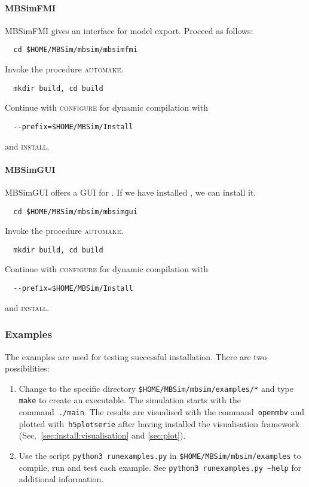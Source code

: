\paragraph{MBSimFMI}
MBSimFMI gives an interface for model export. Proceed as follows:
\begin{verbatim}
  cd $HOME/MBSim/mbsim/mbsimfmi
\end{verbatim}
Invoke the procedure \textsc{automake}.
\begin{verbatim}
  mkdir build, cd build
\end{verbatim}
Continue with \textsc{configure} for dynamic compilation with
\begin{verbatim}
  --prefix=$HOME/MBSim/Install
\end{verbatim}
and \textsc{install}.
%
\paragraph{MBSimGUI}
MBSimGUI offers a GUI for \MBSim{}. If we have installed \OpenMBV{}, we can install it.
\begin{verbatim}
  cd $HOME/MBSim/mbsim/mbsimgui
\end{verbatim}
Invoke the procedure \textsc{automake}.
\begin{verbatim}
  mkdir build, cd build
\end{verbatim}
Continue with \textsc{configure} for dynamic compilation with
\begin{verbatim}
  --prefix=$HOME/MBSim/Install
\end{verbatim}
and \textsc{install}.

\subsubsection{Examples}
The examples are used for testing successful installation. There are two possibilities:
\begin{enumerate}
\item Change to the specific directory \texttt{\$HOME/MBSim/mbsim/examples/*} and type \texttt{make} to create an executable. The simulation starts with the command~\texttt{./main}. The results are visualised with the command~\texttt{openmbv} and plotted with~\texttt{h5plotserie} after having installed the visualisation framework (Sec.~\ref{sec:install:visualisation} and \ref{sec:plot}).
\item Use the script \texttt{python3 runexamples.py} in \texttt{\$HOME/MBSim/mbsim/examples} to compile, run and test each example. See \texttt{python3 runexamples.py --help} for additional information.
\end{enumerate}
%
